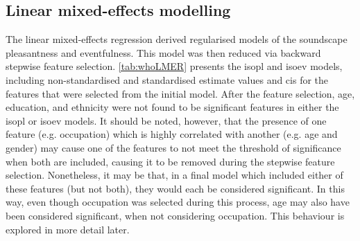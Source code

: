 \subsection{Linear mixed-effects modelling}
\label{sec:whoLMERinit}
The linear mixed-effects regression derived regularised models of the soundscape pleasantness and eventfulness. This model was then reduced via backward stepwise feature selection. \cref{tab:whoLMER} presents the \gls{isopl} and \gls{isoev} models, including non-standardised and standardised estimate values and \glspl{ci} for the features that were selected from the initial model. After the feature selection, age, education, and ethnicity were not found to be significant features in either the \gls{isopl} or \gls{isoev} models. It should be noted, however, that the presence of one feature (e.g. occupation) which is highly correlated with another (e.g. age and gender) may cause one of the features to not meet the threshold of significance when both are included, causing it to be removed during the stepwise feature selection. Nonetheless, it may be that, in a final model which included either of these features (but not both), they would each be considered significant. In this way, even though occupation was selected during this process, age may also have been considered significant, when not considering occupation. This behaviour is explored in more detail later.

